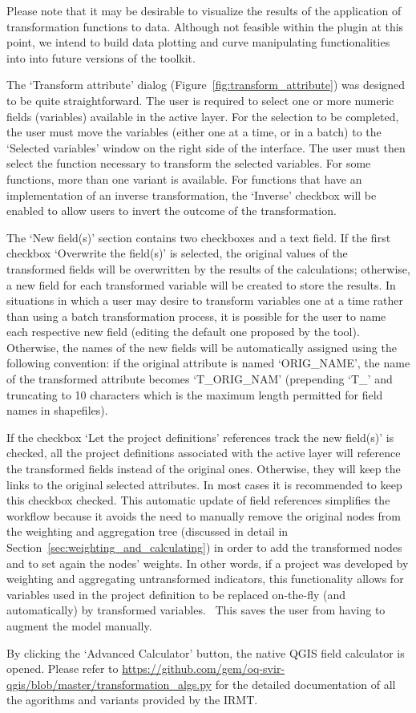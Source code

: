 Please note that it may be desirable to visualize the results of the
application of transformation functions to data. Although not feasible within
the plugin at this point, we intend to build data plotting and curve
manipulating functionalities into into future versions of the toolkit.   

The `Transform attribute' dialog (Figure~\ref{fig:transform_attribute}) was
designed to be quite straightforward. The user is required to select one or
more numeric fields (variables) available in the active layer. For the
selection to be completed, the user must move the variables (either one at a
time, or in a batch) to the `Selected variables' window on the right side of
the interface. The user must then select the function necessary to transform
the selected variables. For some functions, more than one variant is available.
For functions that have an implementation of an inverse transformation, the
`Inverse' checkbox will be enabled to allow users to invert the outcome of the
transformation.

The `New field(s)' section contains two checkboxes and a text field. If the
first checkbox `Overwrite the field(s)' is selected, the original values of the
transformed fields will be overwritten by the results of the calculations;
otherwise, a new field for each transformed variable will be created to store
the results. In situations in which a user may desire to transform variables
one at a time rather than using a batch transformation process, it is possible
for the user to name each respective new field (editing the default one
proposed by the tool). Otherwise, the names of the new fields will be
automatically assigned using the following convention: if the original
attribute is named `ORIG\_NAME', the name of the transformed attribute becomes
`T\_ORIG\_NAM' (prepending `T\_' and truncating to 10 characters which is the
maximum length permitted for field names in shapefiles).

If the checkbox `Let the project definitions' references track the new
field(s)' is checked, all the project definitions associated with the active
layer will reference the transformed fields instead of the original ones.
Otherwise, they will keep the links to the original selected attributes. In
most cases it is recommended to keep this checkbox checked. This automatic
update of field references simplifies the workflow because it avoids the need
to manually remove the original nodes from the weighting and aggregation tree
(discussed in detail in Section~\ref{sec:weighting_and_calculating}) in
order to add the transformed nodes and to set again the nodes' weights. In
other words, if a project was developed by weighting and aggregating
untransformed indicators, this functionality allows for variables used in the
project definition to be replaced on-the-fly (and automatically) by transformed
variables.  This saves the user from having to augment the model manually.  

By clicking the `Advanced Calculator' button, the native QGIS field calculator
is opened.  Please refer to
\url{https://github.com/gem/oq-svir-qgis/blob/master/transformation_algs.py}
for the detailed documentation of all the agorithms and variants provided by
the IRMT.

